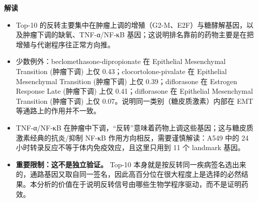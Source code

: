 \documentclass[
  10pt,
]{ctexart}
\providecommand{\tightlist}{%
  \setlength{\itemsep}{0pt}\setlength{\parskip}{0pt}}
\begin{document}
\textbf{解读}

\begin{itemize}
\tightlist
\item
  Top-10
  的反转主要集中在肿瘤上调的增殖（G2-M、E2F）与糖酵解基因，以及肿瘤下调的缺氧、TNF-α/NF-κB
  基因；这说明排名靠前的药物主要是在把增殖与代谢程序往正常方向推。
\item
  少数例外：beclomethasone-dipropionate 在 Epithelial Mesenchymal
  Transition (肿瘤下调) 上仅 0.43；clocortolone-pivalate 在 Epithelial
  Mesenchymal Transition (肿瘤下调) 上仅 0.39；diflorasone 在 Estrogen
  Response Late (肿瘤下调) 上仅 0.41；diflorasone 在 Epithelial
  Mesenchymal Transition (肿瘤下调) 上仅
  0.07。说明同一类别（糖皮质激素）内部在 EMT 等通路上的作用并不一致。
\item
  TNF-α/NF-κB
  在肿瘤中下调，``反转''意味着药物上调这些基因；这与糖皮质激素经典的抗炎/抑制
  NF-κB 作用方向相反，需要谨慎解读：A549 中的 24
  小时转录反应不等于体内免疫效应，且这里只用到 11 个 landmark 基因。
\item
  \textbf{重要限制：这不是独立验证。} Top-10
  本身就是按反转同一疾病签名选出来的，通路基因又取自同一签名，因此高百分位在很大程度上是选择的必然结果。本分析的价值在于说明反转信号由哪些生物学程序驱动，而不是证明药效。
\end{itemize}
\end{document}
